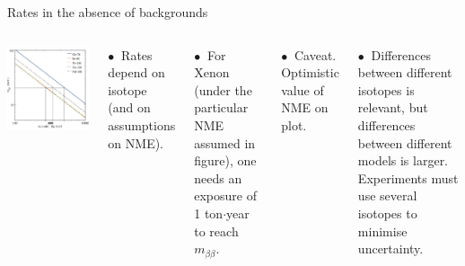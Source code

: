 \documentclass [aspectratio=169]{beamer}
\begin{document}
\begin{frame}{Rates in the absence of backgrounds}
\begin{columns}
\includegraphics[scale=0.43]{ratesbb0nu.png}


$\bullet~$ Rates depend on isotope (and on assumptions on NME). 

$\bullet~$ For Xenon (under the particular NME assumed in figure), one needs an exposure of 1 ton$\cdot$year to reach $m_{\beta\beta}$.

$\bullet~$ Caveat. Optimistic value of NME on plot.  

$\bullet~$ Differences between different isotopes is relevant, but differences between different models is larger. Experiments must use several isotopes to minimise uncertainty. 

\end{columns}
\end{frame}
\end{document}
